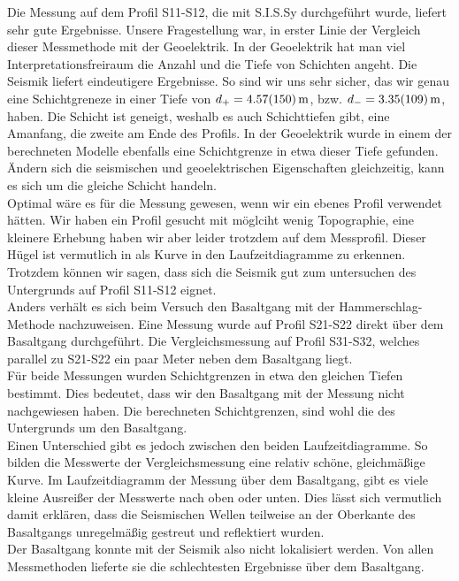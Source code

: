 

Die Messung auf dem Profil S11-S12, die mit S.I.S.Sy durchgeführt wurde, liefert sehr gute Ergebnisse.
Unsere Fragestellung war, in erster Linie der Vergleich dieser Messmethode mit der Geoelektrik. 
In der Geoelektrik hat man viel Interpretationsfreiraum die Anzahl und die Tiefe von Schichten angeht.
Die Seismik liefert eindeutigere Ergebnisse. So sind wir uns sehr sicher, das wir genau eine Schichtgreneze in einer Tiefe von $d_+= \SI{4,57 \pm 1,50}{m}$,
bzw. $d_-= \SI{3,35 \pm 1,09}{m}$, haben. Die Schicht ist geneigt, weshalb es auch Schichttiefen gibt, eine Amanfang,
die zweite am Ende des Profils. In der Geoelektrik wurde in einem der berechneten Modelle ebenfalls eine Schichtgrenze in etwa dieser Tiefe gefunden. 
Ändern sich die seismischen und geoelektrischen Eigenschaften gleichzeitig, kann es sich um die gleiche Schicht handeln. \\
Optimal wäre es für die Messung gewesen, wenn wir ein ebenes Profil verwendet hätten. Wir haben ein Profil gesucht mit möglciht wenig Topographie, 
eine kleinere Erhebung haben wir aber leider trotzdem auf dem Messprofil. Dieser Hügel ist vermutlich in als Kurve in den Laufzeitdiagramme zu erkennen.\\
Trotzdem können wir sagen, dass sich die Seismik gut zum untersuchen des Untergrunds auf Profil S11-S12 eignet. \\
Anders verhält es sich beim Versuch den Basaltgang mit der Hammerschlag-Methode nachzuweisen. 
Eine Messung wurde auf Profil S21-S22 direkt über dem Basaltgang durchgeführt. Die Vergleichsmessung auf Profil S31-S32,
welches parallel zu S21-S22 ein paar Meter neben dem Basaltgang liegt.\\
Für beide Messungen wurden Schichtgrenzen in etwa den gleichen Tiefen bestimmt. Dies bedeutet, dass wir den Basaltgang mit der Messung nicht nachgewiesen haben. 
Die berechneten Schichtgrenzen, sind wohl die des Untergrunds um den Basaltgang. \\
Einen Unterschied gibt es jedoch zwischen den beiden Laufzeitdiagramme. So bilden die Messwerte der Vergleichsmessung eine relativ schöne, gleichmäßige Kurve. 
Im Laufzeitdiagramm der Messung über dem Basaltgang, gibt es viele kleine Ausreißer der Messwerte nach oben oder unten. Dies lässt sich vermutlich damit erklären,
dass die Seismischen Wellen teilweise an der Oberkante des Basaltgangs unregelmäßig gestreut und reflektiert wurden.\\
Der Basaltgang konnte mit der Seismik also nicht lokalisiert werden. Von allen Messmethoden lieferte sie die schlechtesten Ergebnisse über dem Basaltgang.

